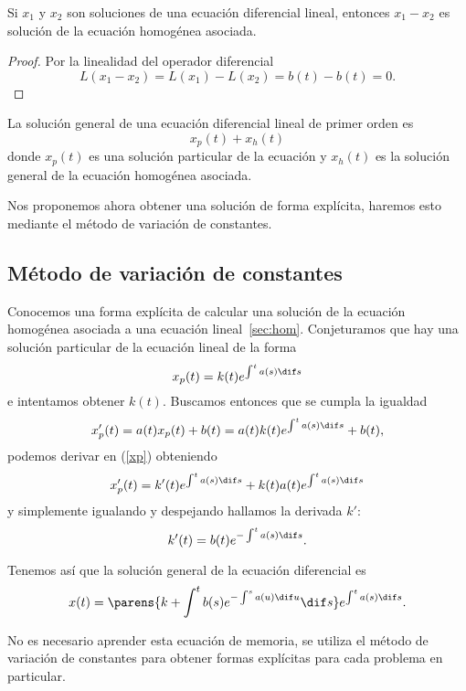 \documentclass[../ecuaciones_diferenciales.tex]{subfiles}
\begin{document}
\begin{lemma}
	Si \(x_1\) y \(x_2\) son soluciones de una ecuación diferencial lineal,
	entonces \(x_1 - x_2\) es solución de la ecuación homogénea asociada.
\end{lemma}

\begin{proof}
	Por la linealidad del operador diferencial
	\[L(x_1 - x_2) = L(x_1) - L(x_2) = b(t) - b(t) = 0.\]
\end{proof}

\begin{corollary}
	La solución general de una ecuación diferencial lineal de primer orden es
	\[x_p(t) + x_h(t)\]
	donde \(x_p(t)\) es una solución particular de la ecuación y \(x_h(t)\) es
	la solución general de la ecuación homogénea asociada.
\end{corollary}

Nos proponemos ahora obtener una solución de forma explícita, haremos esto
mediante el método de variación de constantes.

\subsection{Método de variación de constantes}

Conocemos una forma explícita de calcular una solución de la ecuación homogénea
asociada a una ecuación lineal~\autoref{sec:hom}. Conjeturamos que hay una
solución particular de la ecuación lineal de la forma
\begin{equation}\label{xp}
	x_p(t) = k(t) e^{\int^t a(s) \dif s}
\end{equation}
e intentamos obtener \(k(t)\). Buscamos entonces que se cumpla la igualdad
\[x'_p(t) = a(t)x_p(t) + b(t) = a(t)k(t) e^{\int^t a(s) \dif s} + b(t),\]
podemos derivar en (\ref{xp}) obteniendo
\[x'_p(t) = k'(t) e^{\int^t a(s) \dif s} + k(t)a(t) e^{\int^t a(s) \dif s}\]
y simplemente igualando y despejando hallamos la derivada \(k'\):
\[k'(t) = b(t)e^{-\int^t a(s) \dif s}.\]

Tenemos así que la solución general de la ecuación diferencial es
\[x(t) = \parens{k + \int^t b(s) e^{-\int^s a(u) \dif u} \dif s}
	e^{\int^t a(s) \dif s}.\]

\begin{remark}
	No es necesario aprender esta ecuación de memoria, se utiliza el método de
	variación de constantes para obtener formas explícitas para cada problema en
	particular.
\end{remark}
\end{document}

